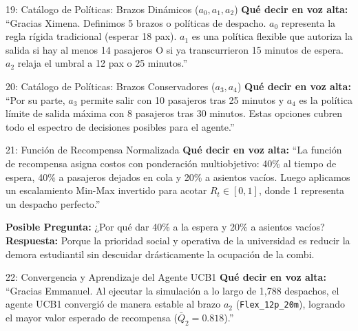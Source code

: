 \documentclass[11pt, a4paper]{article}
\begin{document}
\begin{emmanuelbox}{19: Catálogo de Políticas: Brazos Dinámicos ($a_0, a_1, a_2$)}
\textbf{Qué decir en voz alta:}
``Gracias Ximena. Definimos 5 brazos o políticas de despacho. $a_0$ representa la regla rígida tradicional (esperar 18 pax). $a_1$ es una política flexible que autoriza la salida si hay al menos 14 pasajeros O si ya transcurrieron 15 minutos de espera. $a_2$ relaja el umbral a 12 pax o 25 minutos.''
\end{emmanuelbox}

\begin{emmanuelbox}{20: Catálogo de Políticas: Brazos Conservadores ($a_3, a_4$)}
\textbf{Qué decir en voz alta:}
``Por su parte, $a_3$ permite salir con 10 pasajeros tras 25 minutos y $a_4$ es la política límite de salida máxima con 8 pasajeros tras 30 minutos. Estas opciones cubren todo el espectro de decisiones posibles para el agente.''
\end{emmanuelbox}

\begin{emmanuelbox}{21: Función de Recompensa Normalizada}
\textbf{Qué decir en voz alta:}
``La función de recompensa asigna costos con ponderación multiobjetivo: 40\% al tiempo de espera, 40\% a pasajeros dejados en cola y 20\% a asientos vacíos. Luego aplicamos un escalamiento Min-Max invertido para acotar $R_t \in [0, 1]$, donde 1 representa un despacho perfecto.''

\begin{defensebox}
\textbf{Posible Pregunta:} ¿Por qué dar 40\% a la espera y 20\% a asientos vacíos?\\
\textbf{Respuesta:} Porque la prioridad social y operativa de la universidad es reducir la demora estudiantil sin descuidar drásticamente la ocupación de la combi.
\end{defensebox}
\end{emmanuelbox}

\begin{ximenabox}{22: Convergencia y Aprendizaje del Agente UCB1}
\textbf{Qué decir en voz alta:}
``Gracias Emmanuel. Al ejecutar la simulación a lo largo de 1,788 despachos, el agente UCB1 convergió de manera estable al brazo $a_2$ (\texttt{Flex\_12p\_20m}), logrando el mayor valor esperado de recompensa ($\bar{Q}_2 = 0.818$).''
\end{ximenabox}
\end{document}
